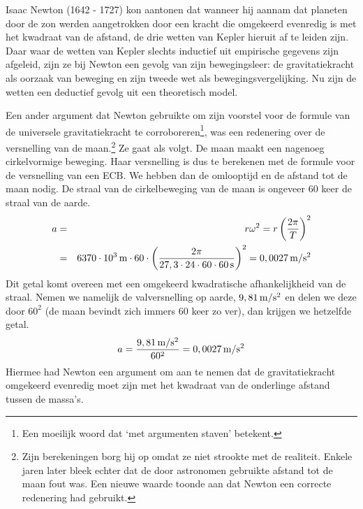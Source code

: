 \documentclass{ximera}
\begin{document}
	\author{Bart Lambregs}
    \xmsource\xmuitleg





	
	
	Isaac Newton (1642 - 1727) kon aantonen dat wanneer hij aannam dat planeten door de zon werden aangetrokken door een kracht die omgekeerd evenredig is met het kwadraat van de afstand, de drie wetten van Kepler hieruit af te leiden zijn. Daar waar de wetten van Kepler slechts inductief uit empirische gegevens zijn afgeleid, zijn ze bij Newton een gevolg van zijn bewegingsleer: de gravitatiekracht als oorzaak van beweging en zijn tweede wet als bewegingsvergelijking. Nu zijn de wetten een deductief gevolg uit een theoretisch model.
	
	Een ander argument dat Newton gebruikte om zijn voorstel voor de formule van de universele gravitatiekracht te corroboreren\footnote{Een moeilijk woord dat `met argumenten staven' betekent.}, was een redenering over de versnelling van de maan.\footnote{Zijn berekeningen borg hij op omdat ze niet strookte met de realiteit. Enkele jaren later bleek echter dat de door astronomen gebruikte afstand tot de maan fout was. Een nieuwe waarde toonde aan dat Newton een correcte redenering had gebruikt.} Ze gaat als volgt. De maan maakt een nagenoeg cirkelvormige beweging. Haar versnelling is dus te berekenen met de formule voor de versnelling van een ECB. We hebben dan de omlooptijd en de afstand tot de maan nodig. De straal van de cirkelbeweging van de maan is ongeveer 60 keer de straal van de aarde.
	\begin{eqnarray*}
		a&=&r\omega^2=r\left(\frac{2\pi}{T}\right)^2\\
		&=&6370\cdot10^3\rm\,m\cdot60\cdot\left(\frac{2\pi}{27,3\cdot24\cdot60\cdot60\rm\,s}\right)^2=0,0027\rm\,m/s^2
	\end{eqnarray*}
	Dit getal komt overeen met een omgekeerd kwadratische afhankelijkheid van de straal. Nemen we namelijk de valversnelling op aarde, $9,81\rm\,m/s^2$ en delen we deze door $60^2$ (de maan bevindt zich immers 60 keer zo ver), dan krijgen we hetzelfde getal.
	\begin{eqnarray*}
		a=\frac{9,81\rm\,m/s^2}{60^2}=0,0027\rm\,m/s^2
	\end{eqnarray*}
	Hiermee had Newton een argument om aan te nemen dat de gravitatiekracht omgekeerd evenredig moet zijn met het kwadraat van de onderlinge afstand tussen de massa's.
	
\end{document}
